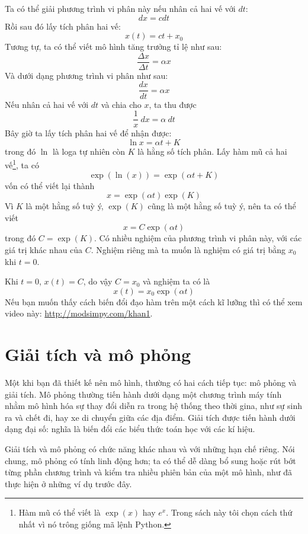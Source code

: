 \documentclass[12pt, openany]{book}
\theoremstyle{exercise}
\begin{document}
Ta có thể giải phương trình vi phân này nếu nhân cả hai vế với $dt$:
%
\[ dx = c dt \]
%
Rồi sau đó lấy tích phân hai vế:
%
\[ x(t) = c t + x_0 \]
%
Tương tự, ta có thể viết mô hình tăng trưởng tỉ lệ như sau:
%
\[ \frac{\Delta x}{\Delta t} = \alpha x \]
%
Và dưới dạng phương trình vi phân như sau:
%
\[ \frac{dx}{dt} = \alpha x \]
%
Nếu nhân cả hai vế với $dt$ và chia cho $x$, ta thu được
%
\[ \frac{1}{x}~dx = \alpha~dt \] 
%
Bây giờ ta lấy tích phân hai vế để nhận được:
%
\[ \ln x = \alpha t + K \]
%
trong đó $\ln$ là loga tự nhiên còn $K$ là hằng số tích phân. Lấy hàm mũ cả hai vế\footnote{Hàm mũ có thể viết là  $\exp(x)$ hay $e^x$.  Trong sách này tôi chọn cách thứ nhất vì nó trông giống mã lệnh Python. }, ta có
%
\[ \exp(\ln(x)) = \exp(\alpha t + K) \]
%
vốn có thể viết lại thành
%
\[ x = \exp(\alpha t) \exp(K) \]
%
Vì $K$ là một hằng số tuỳ ý, $\exp(K)$ cũng là một hằng số tuỳ ý, nên ta có thể viết
%
\[ x = C \exp(\alpha t) \]
%
trong đó $C = \exp(K)$.  Có nhiều nghiệm của phương trình vi phân này, với các giá trị khác nhau của $C$.  Nghiệm riêng mà ta muốn là nghiệm có giá trị bằng $x_0$ khi $t=0$. 

Khi $t=0$, $x(t) = C$, do vậy $C = x_0$ và nghiệm ta có là
%
\[ x(t) = x_0 \exp(\alpha t) \]
%
Nếu bạn muốn thấy cách biến đổi đạo hàm trên một cách kĩ lưỡng thì có thể xem video này: \url{http://modsimpy.com/khan1}.



\section{Giải tích và mô phỏng}

Một khi bạn đã thiết kế nên mô hình, thường có hai cách tiếp tục: mô phỏng và giải tích. Mô phỏng thường tiến hành dưới dạng một chương trình máy tính nhằm mô hình hóa sự thay đổi diễn ra trong hệ thống theo thời gina, như sự sinh ra và chết đi, hay xe di chuyển giữa các địa điểm. Giải tích được tiến hành dưới dạng đại số: nghĩa là biến đổi các biểu thức toán học với các kí hiệu.


Giải tích và mô phỏng có chức năng khác nhau và với những hạn chế riêng. Nói chung, mô phỏng có tính linh động hơn; ta có thể dễ dàng bổ sung hoặc rút bớt từng phần chương trình và kiểm tra nhiều phiên bản của một mô hình, như đã thực hiện ở những ví dụ trước đây.
\end{document}
